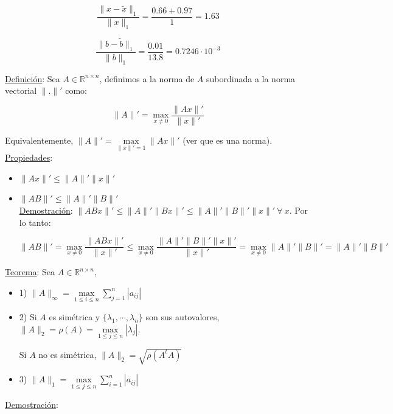 $$\frac{\|x - \tilde{x}\|_{1}}{\|x\|_{1}} = \frac{0.66 + 0.97}{1} = 1.63$$

$$\frac{\|b - \tilde{b}\|_{1}}{\|b\|_{1}} = \frac{0.01}{13.8} = 0.7246\cdot10^{-3}$$

\underline{Definici\'on}: Sea $A \in \mathbb{R}^{n \times n}$, definimos a la norma de $A$ subordinada a la norma vectorial $\|.\|'$
como:

$$\|A\|' = \max \limits_{x \neq 0} \frac{\|Ax\|'}{\|x\|'}$$

Equivalentemente, $\|A\|' = \max \limits_{\|x\|' = 1} \|Ax\|'$ (ver que es una norma).\\

\underline{Propiedades}:

\begin{itemize}
	\item $\|Ax\|' \leq \|A\|'\|x\|'$
	
	\item $\|AB\|' \leq \|A\|'\|B\|'$\\
	
	\underline{Demostraci\'on}: $\|ABx\|' \leq \|A\|'\|Bx\|' \leq \|A\|'\|B\|'\|x\|' \ \forall \ x$. Por lo tanto:
	
	$$\|AB\|' = \max \limits_{x \neq 0} \frac{\|ABx\|'}{\|x\|'} \leq \max \limits_{x \neq 0} \frac{\|A\|'\|B\|'\|x\|'}{\|x\|'} = \max \limits_{x \neq 0} \|A\|'\|B\|' = \|A\|'\|B\|'$$

\end{itemize}

\underline{Teorema}: Sea $A \in \mathbb{R}^{n \times n}$,

\begin{itemize}
	\item 1) $\|A\|_{\infty} = \max \limits_{1 \leq i \leq n} \sum \limits_{j = 1}^{n} |a_{ij}|$
	
	\item 2) Si $A$ es sim\'etrica y $\{\lambda_{1}, \cdots, \lambda_{n}\}$ son sus autovalores, $\|A\|_{2} = \rho(A) = \max \limits_{1 \leq j \leq n} |\lambda_{j}|$.
	
	Si $A$ no es sim\'etrica, $\|A\|_{2} = \sqrt{\rho(A^{t}A)}$
	
	\item 3) $\|A\|_{1} = \max \limits_{1 \leq j \leq n} \sum \limits_{i = 1}^{n} |a_{ij}|$
\end{itemize}

\underline{Demostraci\'on}:

